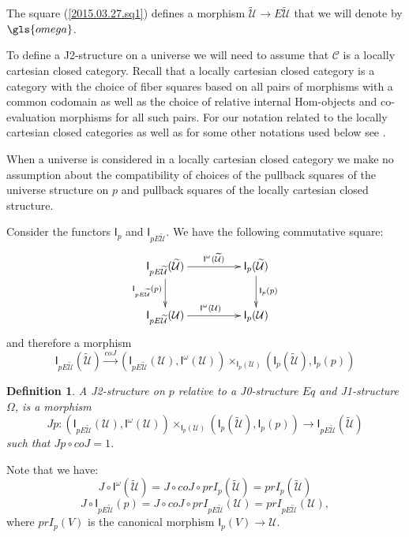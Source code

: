 \documentclass[12pt]{article}
\numberwithin{equation}{section}
\newenvironment{eq}{\begin{equation}}{\end{equation}}
\newtheorem{definition}[proposition]{Definition}
\newcommand{\llabel}[1]{\label{#1}}
\newcommand{\sr}{\rightarrow}
\newcommand{\lr}{\longrightarrow}
\newcommand{\wt}{\widetilde}
\newcommand{\C}{{\mathcal C}}  %
\newcommand{\id}{1}            %
\newcommand{\U}{\mathcal{U}}
\newcommand{\I}{\mathsf{I}}
\begin{document}
The square (\ref{2015.03.27.sq1}) defines a morphism $\wt{\U}\sr E\wt{\U}$ that
we will denote by $\gls{omega}$.

To define a J2-structure on a universe we will need to assume that $\C$
is a locally cartesian closed category.  Recall that a locally cartesian closed
category is a category with the choice of fiber squares based on all pairs of
morphisms with a common codomain as well as the choice of relative internal
Hom-objects and co-evaluation morphisms for all such pairs. For our notation
related to the locally cartesian closed categories as well as for some other
notations used below see \cite{fromunivwithPi}.

When a universe is considered in a locally cartesian closed category we make no
assumption about the compatibility of choices of the pullback squares of the
universe structure on $p$ and pullback squares of the locally cartesian closed
structure.

Consider the functors $\I_{p}$ and $\I_{pE\wt{\U}}$. We have the following
commutative square:
%
\begin{eq}\llabel{2010.sq1}
\begin{xy}
          \xymatrix@C=4pc{ \I_{pE\wt{\U}}(\wt{\U}) \ar[r]^-{\I^{\omega}(\wt{\U})}
            \ar[d]_{\I_{pE\wt{\U}}(p)} & \I_p(\wt{\U})
            \ar[d]^{\I_p(p)}\\ \I_{pE\wt{\U}}(\U) \ar[r]^{\I^{\omega}(\U)} & \I_p(\U) }
\end{xy}
\end{eq}%
%
and therefore a morphism
%
$$\I_{pE\wt{\U}}(\wt{\U}) \stackrel{coJ}{\lr} (\I_{pE\wt{\U}}(\U), \I^{\omega}(\U))
\times_{\I_p(\U)} (\I_p(\wt{\U}), \I_p(p))
$$
%
\begin{definition}
\llabel{2015.03.27.def6} A J2-structure on $p$ relative to a J0-structure $Eq$
and J1-structure $\Omega$, is a morphism
%
$$ Jp:( \I_{pE\wt{\U}}(\U), \I^{\omega}(\U))\times_{\I_p(\U)} (\I_p(\wt{\U}), \I_p(p))\sr
\I_{pE\wt{\U}}(\wt{\U}) $$
%
such that $Jp\circ coJ = \id$.
\end{definition}
%
Note that we have:
%
\begin{eq}
\llabel{2015.04.04.eq1} J\circ \I^{\omega}(\wt{\U})=J\circ coJ\circ
prI_p(\wt{\U})=prI_{p}(\wt{\U})
\end{eq}%
%
\begin{eq}
\llabel{2015.04.04.eq2} J\circ \I_{pE\wt{\U}}(p)=J\circ coJ\circ
prI_{pE\wt{\U}}(\U)=prI_{pE\wt{\U}}(\U),
\end{eq}%
%
where $prI_p(V)$ is the canonical morphism $\I_p(V)\sr \U$.
\end{document}
